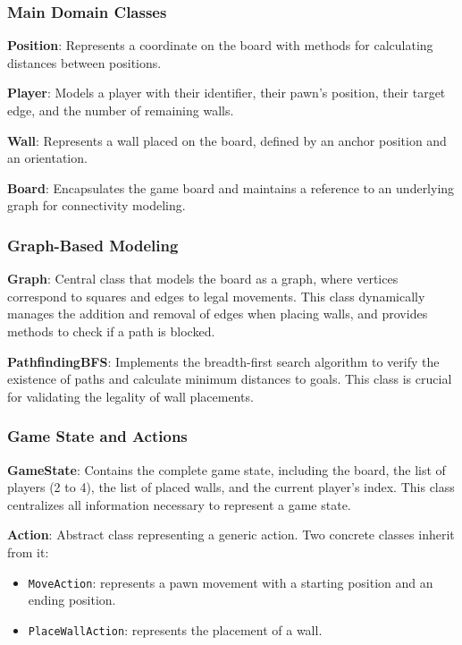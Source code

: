 \documentclass[a4paper]{article}
\begin{document}
\subsubsection{Main Domain Classes}

\textbf{Position}: Represents a coordinate on the board with methods for
calculating distances between positions.

\textbf{Player}: Models a player with their identifier, their pawn's position,
their target edge, and the number of remaining walls.

\textbf{Wall}: Represents a wall placed on the board, defined by an anchor
position and an orientation.

\textbf{Board}: Encapsulates the game board and maintains a reference to an
underlying graph for connectivity modeling.

\subsubsection{Graph-Based Modeling}

\textbf{Graph}: Central class that models the board as a graph, where vertices
correspond to squares and edges to legal movements. This class dynamically
manages the addition and removal of edges when placing walls, and provides
methods to check if a path is blocked.

\textbf{PathfindingBFS}: Implements the breadth-first search algorithm to verify
the existence of paths and calculate minimum distances to goals. This class is
crucial for validating the legality of wall placements.

\subsubsection{Game State and Actions}

\textbf{GameState}: Contains the complete game state, including the board, the
list of players (2 to 4), the list of placed walls, and the current player's
index. This class centralizes all information necessary to represent a game
state.

\textbf{Action}: Abstract class representing a generic action. Two concrete
classes inherit from it:
\begin{itemize}
  \item \texttt{MoveAction}: represents a pawn movement with a starting
    position and an ending position.
  \item \texttt{PlaceWallAction}: represents the placement of a wall.
\end{itemize}
\end{document}
